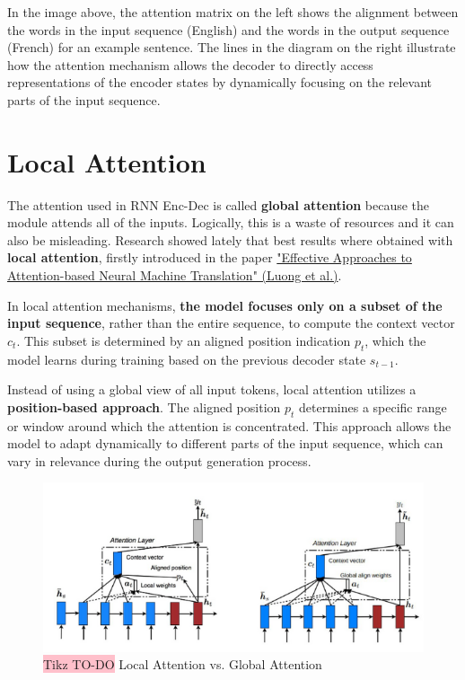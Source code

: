In the image above, the attention matrix on the left shows the alignment between the words in the input sequence (English) and the words in the output sequence (French) for an example sentence. The lines in the diagram on the right illustrate how the attention mechanism allows the decoder to directly access representations of the encoder states by dynamically focusing on the relevant parts of the input sequence.


\section{Local Attention}

The attention used in RNN Enc-Dec is called \textbf{global attention} because the module attends all of the inputs. Logically, this is a waste of resources and it can also be misleading. Research showed lately that best results where obtained with \textbf{local attention}, firstly introduced in the paper \href{https://arxiv.org/pdf/1508.04025}{"Effective Approaches to Attention-based Neural Machine Translation" (Luong et al.)}.

In local attention mechanisms, \textbf{the model focuses only on a subset of the input sequence}, rather than the entire sequence, to compute the context vector $c_t$. This subset is determined by an aligned position indication $p_t$, which the model learns during training based on the previous decoder state $s_{t-1}$.

Instead of using a global view of all input tokens, local attention utilizes a \textbf{position-based approach}. The aligned position $p_t$ determines a specific range or window around which the attention is concentrated. This approach allows the model to adapt dynamically to different parts of the input sequence, which can vary in relevance during the output generation process.

\begin{figure}[!htbp]
    \centering
    \includegraphics[width=\linewidth]{tikz/chapter7 - Local Attention Comparison.png}
    \caption{{\color{red}\colorbox{pink}{Tikz TO-DO}} Local Attention vs. Global Attention}
\end{figure}

